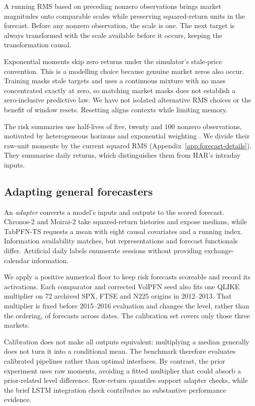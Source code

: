 A running RMS based on preceding nonzero observations brings market magnitudes onto comparable scales while preserving squared-return units in the forecast. Before any nonzero observation, the scale is one. The next target is always transformed with the scale available before it occurs, keeping the transformation causal.

Exponential moments skip zero returns under the simulator's stale-price convention. This is a modelling choice because genuine market zeros also occur. Training masks stale targets and uses a continuous mixture with no mass concentrated exactly at zero, so matching market masks does not establish a zero-inclusive predictive law. We have not isolated alternative RMS choices or the benefit of window resets. Resetting aligns contexts while limiting memory.

The risk summaries use half-lives of five, twenty and 100 nonzero observations, motivated by heterogeneous horizons and exponential weighting \citep{corsi2009simple,riskmetrics1996}. We divide their raw-unit moments by the current squared RMS (Appendix~\ref{app:forecast-details}). They summarise daily returns, which distinguishes them from HAR's intraday inputs.

\subsection{Adapting general forecasters}

An \emph{adapter} converts a model's inputs and outputs to the scored forecast. Chronos-2 and Moirai-2 take squared-return histories and expose medians, while TabPFN-TS requests a mean with eight causal covariates and a running index. Information availability matches, but representations and forecast functionals differ. Artificial daily labels enumerate sessions without providing exchange-calendar information.

We apply a positive numerical floor to keep risk forecasts scoreable and record its activations. Each comparator and corrected VolPFN seed also fits one QLIKE multiplier on 72 archived SPX, FTSE and N225 origins in 2012--2013. That multiplier is fixed before 2015--2016 evaluation and changes the level, rather than the ordering, of forecasts across dates. The calibration set covers only those three markets.

Calibration does not make all outputs equivalent: multiplying a median generally does not turn it into a conditional mean. The benchmark therefore evaluates calibrated pipelines rather than optimal interfaces. By contrast, the prior experiment uses raw moments, avoiding a fitted multiplier that could absorb a prior-related level difference. Raw-return quantiles support adapter checks, while the brief LSTM integration check contributes no substantive performance evidence.

